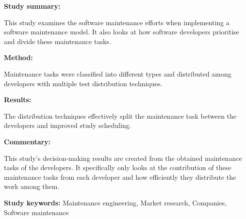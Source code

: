 \begin{tcolorbox}[colback=gray!5!white, colframe=pastelgreen!40!black, title=Trends in software maintenance tasks distribution among programmers: A study in a micro software company \cite{Stojanov2017}]
	\begin{minipage}[t]{0.25\textwidth}
		\textbf{Study summary:}
	\end{minipage}
	\hfill
	\begin{minipage}[t]{0.65\textwidth}
		This study examines the software maintenance efforts when implementing a software
		maintenance model. It also looks at how software developers prioritise and divide these
		maintenance tasks.
	\end{minipage}

	\vspace{0.75em} 

	\begin{minipage}[t]{0.25\textwidth}
		\textbf{Method:}
	\end{minipage}
	\hfill
	\begin{minipage}[t]{0.65\textwidth}
		Maintenance tasks were classified into different types and distributed among developers with multiple test distribution techniques.
	\end{minipage}

	\vspace{0.75em} 

	\begin{minipage}[t]{0.25\textwidth}
		\textbf{Results:}
	\end{minipage}
	\hfill
	\begin{minipage}[t]{0.65\textwidth}
		The distribution techniques effectively split the maintenance task between the developers and improved study scheduling.
	\end{minipage}

	\vspace{0.75em} 

	\begin{minipage}[t]{0.25\textwidth}
		\textbf{Commentary:}
	\end{minipage}
	\hfill
	\begin{minipage}[t]{0.65\textwidth}
		This study's decision-making results are created from the obtained maintenance tasks of the
		developers. It specifically only looks at the contribution of these maintenance tasks from
		each developer and how efficiently they distribute the work among them.
	\end{minipage}
	\tcblower
	\textbf{Study keywords:} Maintenance engineering, Market research, Companies, Software
	maintenance
\end{tcolorbox}

